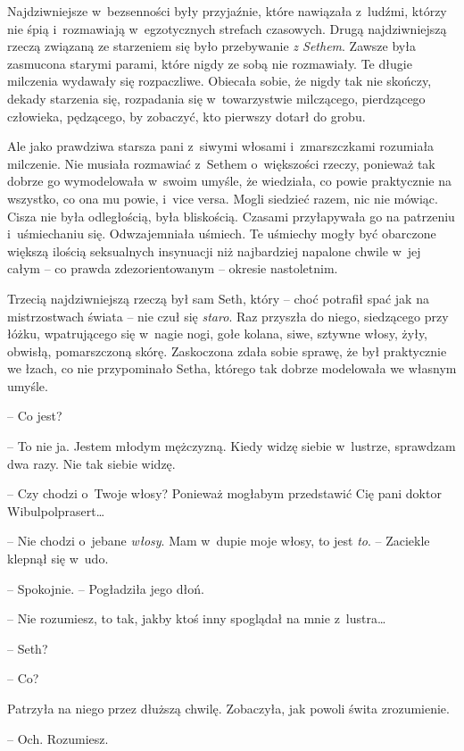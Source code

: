 \documentclass[oneside,polish,11pt,sfheadings]{mwbk}
\begin{document}
Najdziwniejsze w~bezsenności były przyjaźnie, które nawiązała z~ludźmi,
którzy nie śpią i~rozmawiają w~egzotycznych strefach czasowych. Drugą
najdziwniejszą rzeczą związaną ze starzeniem się było przebywanie
\textit{z Sethem}. Zawsze była zasmucona starymi parami, które nigdy ze
sobą nie rozmawiały. Te długie milczenia wydawały się rozpaczliwe.
Obiecała sobie, że nigdy tak nie skończy, dekady starzenia się,
rozpadania się w~towarzystwie milczącego, pierdzącego człowieka,
pędzącego, by zobaczyć, kto pierwszy dotarł do grobu.

Ale jako prawdziwa starsza pani z~siwymi włosami i~zmarszczkami
rozumiała milczenie. Nie musiała rozmawiać z~Sethem o~większości rzeczy,
ponieważ tak dobrze go wymodelowała w~swoim umyśle, że wiedziała, co
powie praktycznie na wszystko, co ona mu powie, i~vice versa. Mogli
siedzieć razem, nic nie mówiąc. Cisza nie była odległością, była
bliskością. Czasami przyłapywała go na patrzeniu i~uśmiechaniu się.
Odwzajemniała uśmiech. Te uśmiechy mogły być obarczone większą ilością
seksualnych insynuacji niż najbardziej napalone chwile w~jej całym -- co
prawda zdezorientowanym -- okresie nastoletnim.

Trzecią najdziwniejszą rzeczą był sam Seth, który -- choć potrafił spać
jak na mistrzostwach świata -- nie czuł się \textit{staro}. Raz przyszła do
niego, siedzącego przy łóżku, wpatrującego się w~nagie nogi, gołe
kolana, siwe, sztywne włosy, żyły, obwisłą, pomarszczoną skórę.
Zaskoczona zdała sobie sprawę, że był praktycznie we łzach, co nie
przypominało Setha, którego tak dobrze modelowała we własnym umyśle.

-- Co jest?

-- To nie ja. Jestem młodym mężczyzną. Kiedy widzę siebie w~lustrze,
sprawdzam dwa razy. Nie tak siebie widzę.

-- Czy chodzi o~Twoje włosy? Ponieważ mogłabym przedstawić Cię pani
doktor Wibulpolprasert\ldots 

-- Nie chodzi o~jebane \textit{włosy}. Mam w~dupie moje włosy, to jest
\textit{to}. -- Zaciekle klepnął się w~udo.

-- Spokojnie. -- Pogładziła jego dłoń.

-- Nie rozumiesz, to tak, jakby ktoś inny spoglądał na mnie z~lustra\ldots 

-- Seth?

-- Co?

Patrzyła na niego przez dłuższą chwilę. Zobaczyła, jak powoli świta
zrozumienie.

-- Och. Rozumiesz.
\end{document}

